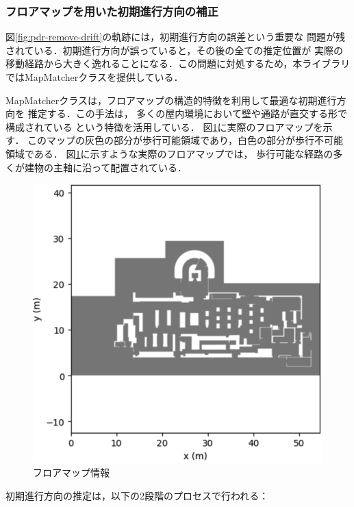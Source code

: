 

\subsubsection{フロアマップを用いた初期進行方向の補正}

図\ref{fig:pdr-remove-drift}の軌跡には，初期進行方向の誤差という重要な
問題が残されている．初期進行方向が誤っていると，その後の全ての推定位置が
実際の移動経路から大きく逸れることになる．この問題に対処するため，本ライブラリ
ではMapMatcherクラスを提供している．

MapMatcherクラスは，フロアマップの構造的特徴を利用して最適な初期進行方向を
推定する．この手法は，
多くの屋内環境において壁や通路が直交する形で構成されている
という特徴を活用している．
図\ref{fig:floor-map}に実際のフロアマップを示す．
このマップの灰色の部分が歩行可能領域であり，白色の部分が歩行不可能領域である．
図\ref{fig:floor-map}に示すような実際のフロアマップでは，
歩行可能な経路の多くが建物の主軸に沿って配置されている．

\begin{figure}[H]
	\centering
	\includegraphics[width=\linewidth]{image/floor-map.jpg}
  \caption{フロアマップ情報} \label{fig:floor-map}
\end{figure}

初期進行方向の推定は，以下の2段階のプロセスで行われる：

